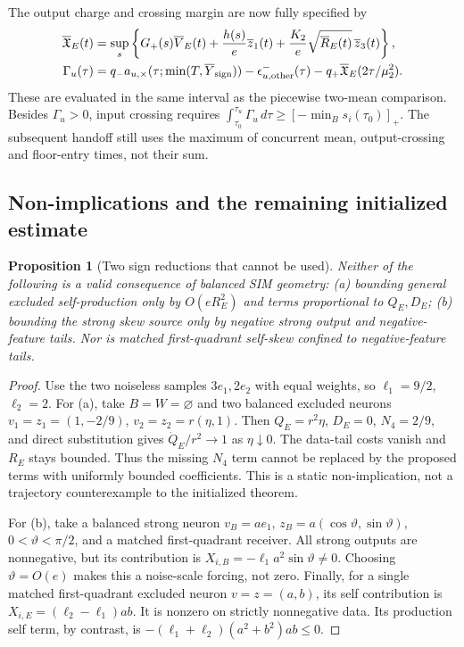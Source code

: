 \documentclass{article} %
\theoremstyle{plain}
\newtheorem{proposition}[theorem]{Proposition}
\theoremstyle{definition}
\theoremstyle{remark}
\begin{document}
The output charge and crossing margin are now fully specified by
\begin{align}
 \overline{\mathfrak X}_E(t)
 &=\sup_s\left\{G_+(s)\overline V_E(t)
       +\frac{h(s)}e\overline z_1(t)
       +\frac{K_2}e\sqrt{\overline R_E(t)}\,\overline z_3(t)\right\},
       \label{sbcouple:output-clock}\\
 \Gamma_u(\tau)
 &=q_-a_{u,\times}(\tau;\min(T,\overline Y_{\rm sign}))
       -\epsilon_{u,\rm other}^-(\tau)
       -q_+\overline{\mathfrak X}_E(2\tau/\mu_2^2).
       \label{sbcouple:clock}
\end{align}
These are evaluated in the same interval as the piecewise two-mean
comparison. Besides $\Gamma_u>0$, input crossing requires
$\int_{\tau_0}^{\tau_u}\Gamma_u\,d\tau\ge[-\min_Bs_i(\tau_0)]_+$.
The subsequent handoff still uses the maximum of concurrent mean,
output-crossing and floor-entry times, not their sum.

\subsection{Non-implications and the remaining initialized estimate}

\begin{proposition}[Two sign reductions that cannot be used]
\label{sbcouple:obstructions}
Neither of the following is a valid consequence of balanced SIM geometry:
(a) bounding general excluded self-production only by $O(eR_E^2)$ and
terms proportional to $Q_E,D_E$;
(b) bounding the strong skew source only by negative strong output and
negative-feature tails. Nor is matched first-quadrant self-skew confined
to negative-feature tails.
\end{proposition}
\begin{proof}
Use the two noiseless samples $3e_1,2e_2$ with equal weights, so
$\ell_1=9/2$, $\ell_2=2$.
For (a), take $B=W=\varnothing$ and two balanced excluded neurons
$v_1=z_1=(1,-2/9)$, $v_2=z_2=r(\eta,1)$.
Then $Q_E=r^2\eta$, $D_E=0$, $N_4=2/9$, and direct substitution gives
$\dot Q_E/r^2\to1$ as $\eta\downarrow0$.
The data-tail costs vanish and $R_E$ stays bounded. Thus the missing
$N_4$ term cannot be replaced by the proposed terms with uniformly
bounded coefficients. This is a static non-implication, not a trajectory
counterexample to the initialized theorem.

For (b), take a balanced strong neuron
$v_B=a e_1$, $z_B=a(\cos\vartheta,\sin\vartheta)$, $0<\vartheta<\pi/2$,
and a matched first-quadrant receiver. All strong outputs are nonnegative,
but its contribution is
$X_{i,B}=-\ell_1a^2\sin\vartheta\ne0$.
Choosing $\vartheta=O(e)$ makes this a noise-scale forcing, not zero.
Finally, for a single matched first-quadrant excluded neuron $v=z=(a,b)$,
its self contribution is $X_{i,E}=(\ell_2-\ell_1)ab$.
It is nonzero on strictly nonnegative data. Its production self term,
by contrast, is $-(\ell_1+\ell_2)(a^2+b^2)ab\le0$.
\end{proof}
\end{document}
